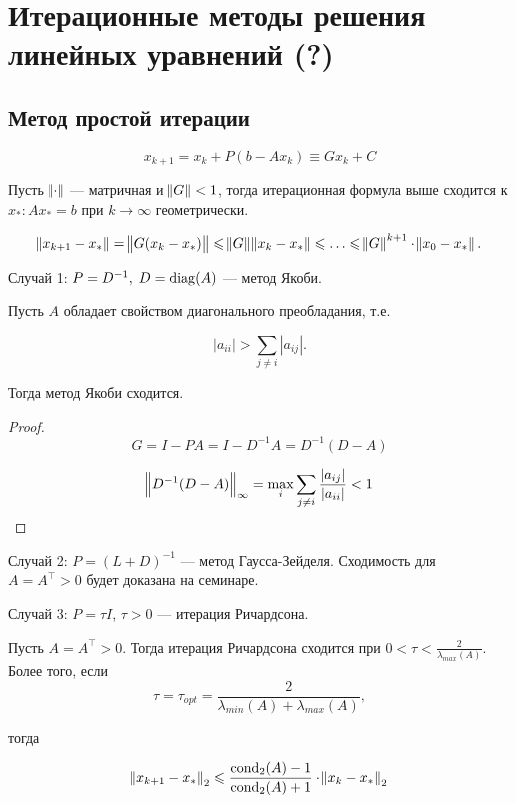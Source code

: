 \section{Итерационные методы решения линейных уравнений (?)}

\subsection{Метод простой итерации}

\[
    x_{k + 1} = x_k + P (b - A x_k) \equiv G x_k + C
\]

\begin{theorem}
    Пусть $\norm{\cdot}$ --- матричная и $\norm{G} < 1$, тогда итерационная
    формула выше сходится к $x_*: A x_* = b$ при $k \to \infty$ геометрически.

    \[
        \norm{x_{k + 1} - x_*} = \norm{G (x_k - x_*)}
        \le \norm{G} \norm{x_k - x_*} \le \dots
        \le \norm{G}^{k + 1} \cdot \norm{x_0 - x_*}.
    \]
\end{theorem}

Случай 1: $P = D^{-1}, \; D = \operatorname{diag}(A)$ --- метод Якоби.

\begin{theorem}
    Пусть $A$ обладает свойством диагонального преобладания, т.е.

    \[
        |a_{ii}| > \sum_{j \ne i} |a_{ij}|.
    \]

    Тогда метод Якоби сходится.
\end{theorem}

\begin{proof}
    \[
        G = I - P A = I - D^{-1} A = D^{-1} (D - A)
    \]

    \[
        \norm{D^{-1}(D - A)}_\infty
        = \max_i \sum_{j \ne i} \frac{|a_{ij}|}{|a_{ii}|} < 1
    \]
\end{proof}

Случай 2: $P = (L + D)^{-1}$ --- метод Гаусса-Зейделя. Сходимость для
$A = A^\top > 0$ будет доказана на семинаре.

Случай 3: $P = \tau I$, $\tau > 0$ --- итерация Ричардсона.

\begin{theorem}
    Пусть $A = A^\top > 0$. Тогда итерация Ричардсона сходится при
    $0 < \tau < \frac{2}{\lambda_{max}(A)}$. Более того, если
    \[
        \tau = \tau_{opt} = \frac{2}{\lambda_{min}(A) + \lambda_{max}(A)},
    \]

    тогда

    \[
        \norm{x_{k + 1} - x_*}_2 \leqslant \frac{\operatorname{cond}_2(A) - 1}{\operatorname{cond}_2(A) + 1}
        \cdot \norm{x_k - x_*}_2
    \]
\end{theorem}

